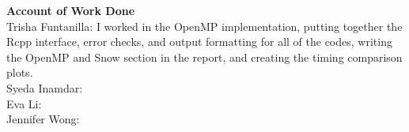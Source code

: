 \null
\textbf{\LARGE{Account of Work Done}}\\
\null
Trisha Funtanilla: I worked in the OpenMP implementation, putting together the Rcpp interface, error checks, and output formatting for all of the codes, writing the OpenMP and Snow section in the report, and creating the timing comparison plots.
\\
\null
Syeda Inamdar:
\\
\null
Eva Li: 
\\
\null
Jennifer Wong:



